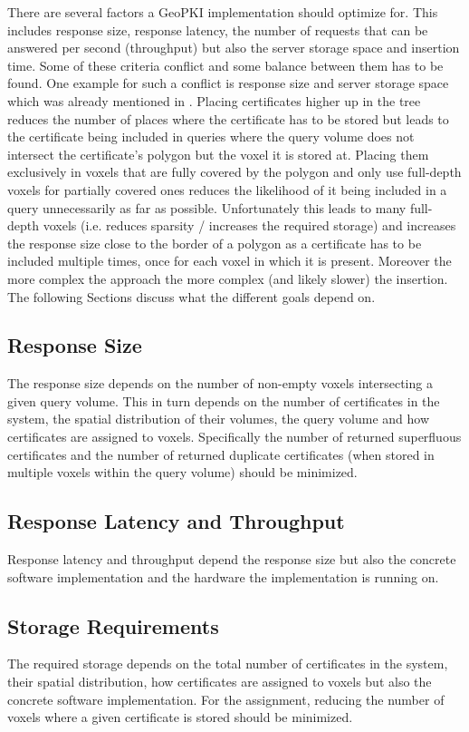 \documentclass[10pt,conference,compsocconf]{IEEEtran}
\begin{document}
There are several factors a GeoPKI implementation should optimize for. This includes response size, response latency, the number of requests that can be answered per second (throughput) but also the server storage space and insertion time.
Some of these criteria conflict and some balance between them has to be found.
One example for such a conflict is response size and server storage space which was already mentioned in .
Placing certificates higher up in the tree reduces the number of places where the certificate has to be stored but leads to the certificate being included in queries where the query volume does not intersect the certificate's polygon but the voxel it is stored at.
Placing them exclusively in voxels that are fully covered by the polygon and only use full-depth voxels for partially covered ones reduces the likelihood of it being included in a query unnecessarily as far as possible.
Unfortunately this leads to many full-depth voxels (i.e. reduces sparsity / increases the required storage) and increases the response size close to the border of a polygon as a certificate has to be included multiple times, once for each voxel in which it is present.
Moreover the more complex the approach the more complex (and likely slower) the insertion.
The following Sections discuss what the different goals depend on.

\subsection{Response Size}
The response size depends on the number of non-empty voxels intersecting a given query volume.
This in turn depends on the number of certificates in the system, the spatial distribution of their volumes, the query volume and how certificates are assigned to voxels.
Specifically the number of returned superfluous certificates and the number of returned duplicate certificates (when stored in multiple voxels within the query volume) should be minimized.

\subsection{Response Latency and Throughput}
Response latency and throughput depend the response size but also the concrete software implementation and the hardware the implementation is running on.

\subsection{Storage Requirements}
The required storage depends on the total number of certificates in the system, their spatial distribution, how certificates are assigned to voxels but also the concrete software implementation.
For the assignment, reducing the number of voxels where a given certificate is stored should be minimized.
\end{document}
